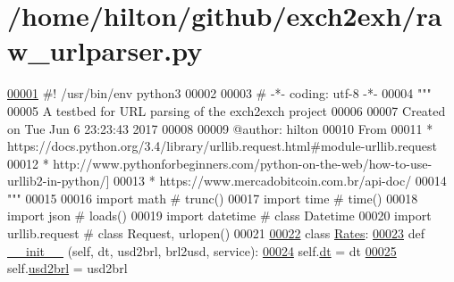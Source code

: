 \hypertarget{raw__urlparser_8py_source}{}\section{/home/hilton/github/exch2exh/raw\+\_\+urlparser.py}

\begin{DoxyCode}
\hyperlink{namespaceraw__urlparser}{00001} \textcolor{comment}{#! /usr/bin/env python3 }
00002 
00003 \textcolor{comment}{# -*- coding: utf-8 -*-}
00004 \textcolor{stringliteral}{"""}
00005 \textcolor{stringliteral}{A testbed for URL parsing of the exch2exch project}
00006 \textcolor{stringliteral}{}
00007 \textcolor{stringliteral}{Created on Tue Jun  6 23:23:43 2017}
00008 \textcolor{stringliteral}{}
00009 \textcolor{stringliteral}{@author: hilton}
00010 \textcolor{stringliteral}{From }
00011 \textcolor{stringliteral}{* https://docs.python.org/3.4/library/urllib.request.html#module-urllib.request}
00012 \textcolor{stringliteral}{* http://www.pythonforbeginners.com/python-on-the-web/how-to-use-urllib2-in-python/]}
00013 \textcolor{stringliteral}{* https://www.mercadobitcoin.com.br/api-doc/}
00014 \textcolor{stringliteral}{"""}
00015 
00016 \textcolor{keyword}{import} math           \textcolor{comment}{# trunc()  }
00017 \textcolor{keyword}{import} time           \textcolor{comment}{# time()  }
00018 \textcolor{keyword}{import} json           \textcolor{comment}{# loads()  }
00019 \textcolor{keyword}{import} datetime       \textcolor{comment}{# class Datetime  }
00020 \textcolor{keyword}{import} urllib.request \textcolor{comment}{# class Request, urlopen()}
00021 
\hyperlink{classraw__urlparser_1_1_rates}{00022} \textcolor{keyword}{class }\hyperlink{classraw__urlparser_1_1_rates}{Rates}:
\hyperlink{classraw__urlparser_1_1_rates_a7d9b61bce159f7e52bdf8a1ebfada45d}{00023}     \textcolor{keyword}{def }\hyperlink{classraw__urlparser_1_1_rates_a7d9b61bce159f7e52bdf8a1ebfada45d}{\_\_init\_\_} (self, dt, usd2brl, brl2usd, service):
\hyperlink{classraw__urlparser_1_1_rates_a09b3c7cb595f3135c3eda648b1bb4c3f}{00024}         self.\hyperlink{classraw__urlparser_1_1_rates_a09b3c7cb595f3135c3eda648b1bb4c3f}{dt}  = dt
\hyperlink{classraw__urlparser_1_1_rates_a52d9b688be8385a87783b27839749b4a}{00025}         self.\hyperlink{classraw__urlparser_1_1_rates_a52d9b688be8385a87783b27839749b4a}{usd2brl} = usd2brl

\end{DoxyCode}

